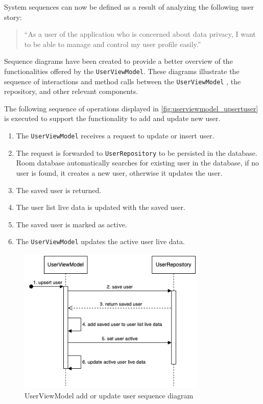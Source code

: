System sequences can now be defined as a result of analyzing the following user story:
\begin{quotation}
    \enquote{As a user of the application who is concerned about data privacy, I want to be able to manage and control my user profile easily.}
\end{quotation}
Sequence diagrams have been created to provide a better overview of the functionalities offered by the \texttt{UserViewModel}. These diagrams illustrate the sequence of interactions and method calls between the \texttt{UserViewModel} , the repository, and other relevant components.

The following sequence of operations displayed in \autoref{fig:userviewmodel_upsertuser} is executed to support the functionality to add and update new user.
\begin{enumerate}
    \item The \texttt{UserViewModel} receives a request to update or insert user.
    \item The request is forwarded to \texttt{UserRepository} to be persisted in the database. Room database automatically searches for existing user in the database, if no user is found, it creates a new user, otherwise it updates the user.
    \item The saved user is returned.
    \item The user list live data is updated with the saved user.
    \item The saved user is marked as active.
    \item The \texttt{UserViewModel} updates the active user live data.
\end{enumerate}

\begin{figure}[H]
    \centering
    \includegraphics[width=0.8\textwidth]{diagrams/upsert-user-vm.drawio.png}
    \caption{UserViewModel add or update user sequence diagram}
    \label{fig:userviewmodel_upsertuser}
\end{figure}

